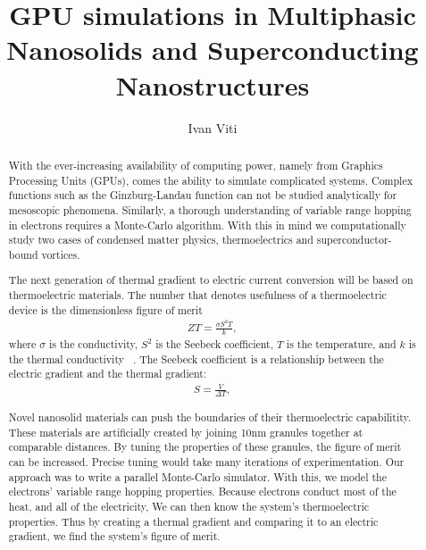 \documentclass[12pt]{niuthesis}
\begin{document}
\title{GPU simulations in Multiphasic Nanosolids and Superconducting Nanostructures}

\author{Ivan Viti}


\begin{abstract}
	With the ever-increasing availability of computing power, namely from Graphics Processing Units (GPUs), comes the ability to simulate complicated systems. Complex functions such as the Ginzburg-Landau function can not be studied analytically for mesoscopic phenomena. Similarly, a thorough understanding of variable range hopping in electrons requires a Monte-Carlo algorithm. With this in mind we computationally study two cases of condensed matter physics, thermoelectrics and superconductor-bound vortices.

	The next generation of thermal gradient to electric current conversion will be based on thermoelectric materials. The number that denotes usefulness of a thermoelectric device is the dimensionless figure of merit
\begin{eqnarray}
ZT = \frac{\sigma S^2 T}{k},
\label{ZT}
\end{eqnarray}
where $\sigma$ is the conductivity, $S^2$ is the Seebeck coefficient, $T$ is the temperature, and $k$ is the thermal conductivity ~\cite{chen}. The Seebeck coefficient is a relationship between the electric gradient and the thermal gradient:
\begin{eqnarray}
S = \frac{V}{\Delta T},
\label{Seebeck}
\end{eqnarray}

 Novel nanosolid materials can push the boundaries of their thermoelectric capabilitity. These materials are artificially created by joining 10nm  granules together at comparable distances. By tuning the properties of these granules, the figure of merit can be increased. Precise tuning would take many iterations of experimentation. Our approach was to write a parallel Monte-Carlo simulator. With this, we model the electrons' variable range hopping properties. Because electrons conduct most of the heat, and all of the electricity, We can then know the system's thermoelectric properties. Thus by creating a thermal gradient and comparing it to an electric gradient, we find the system's figure of merit. 



\end{abstract}
\end{document}
